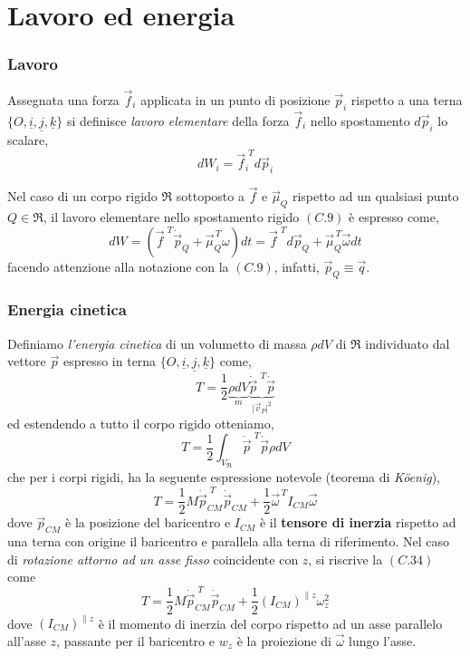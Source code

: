 \section{Lavoro ed energia}
\subsubsection{Lavoro}
Assegnata una forza $\vec{f}_i$ applicata in un punto di posizione $\vec{p}_i$ rispetto a una terna $\lbrace O, \underline{i}, \underline{j}, \underline{k} \rbrace$ si definisce \emph{lavoro elementare} della forza $\vec{f}_i$ nello spostamento $d\vec{p}_i$ lo scalare,
\begin{equation}
	dW_i = \vec{f}_i^{\,\,T} d\vec{p}_i
\end{equation}

Nel caso di un corpo rigido $\mathfrak{R}$ sottoposto a $\vec{f}$ e $\vec{\mu}_Q$ rispetto ad un qualsiasi punto $Q \in \mathfrak{R}$, il lavoro elementare nello spostamento rigido $(C.9)$ è espresso come, 
\begin{equation}
	dW = (\vec{f}^{\,\,T} \dot{\vec{p}}_Q + \vec{\mu}^{\,T}_Q \omega)dt = \vec{f}^{\,\,T} d\vec{p}_Q + \vec{\mu}_Q^{\,T} \vec{\omega} dt
\end{equation}
facendo attenzione alla notazione con la $(C.9)$, infatti, $\vec{p}_Q \equiv \vec{q}$.

\subsubsection{Energia cinetica}
Definiamo \emph{l'energia cinetica} di un volumetto di massa $\rho dV$ di $\mathfrak{R}$ individuato dal vettore $\vec{p}$ espresso in terna $\lbrace O, \underline{i}, \underline{j}, \underline{k} \rbrace$ come,
\begin{equation}
	T = \frac{1}{2} \underbrace{\rho dV}_{m} \underbrace{\dot{\vec{p}}^{\,\,T} \dot{\vec{p}}}_{\vert\vec{v}_{P}\vert^2}
\end{equation}
ed estendendo a tutto il corpo rigido otteniamo,
\begin{equation}
	T = \frac{1}{2} \int_{V_{\mathfrak{R}}} \dot{\vec{p}}^{\,\,T} \dot{\vec{p}} \rho dV
\end{equation}
che per i corpi rigidi, ha la seguente espressione notevole (teorema di \emph{Köenig}),
\begin{equation}
T = \frac{1}{2} M \dot{\vec{p}}_{CM}^{\,\,T} \dot{\vec{p}}_{CM} + \frac{1}{2} \vec{\omega}^{\,T} I_{CM} \vec{\omega}
\end{equation}
dove $\vec{p}_{CM}$ è la posizione del baricentro e $I_{CM}$ è il \textbf{tensore di inerzia} rispetto ad una terna con origine il baricentro e parallela alla terna di riferimento. Nel caso di \emph{rotazione attorno ad un asse fisso} coincidente con $z$, si riscrive la $(C.34)$ come
\begin{equation}
	T = \frac{1}{2} M \dot{\vec{p}}_{CM}^{\,\,T} \dot{\vec{p}}_{CM} + \frac{1}{2} (I_{CM})^{\parallel z} \omega_z^2
\end{equation}
dove $(I_{CM})^{\parallel z}$ è il momento di inerzia del corpo rispetto ad un asse parallelo all'asse $z$, passante per il baricentro e $w_z$ è la proiezione di $\vec{\omega}$ lungo l'asse.

